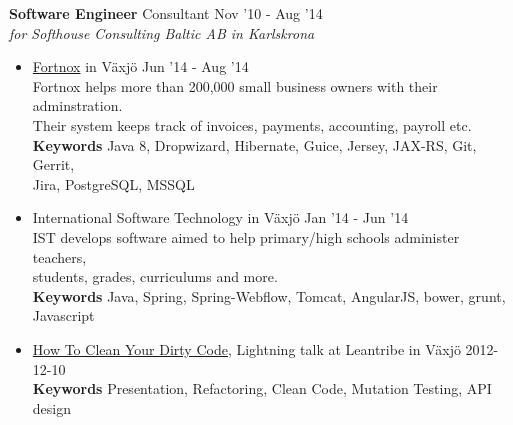 \documentclass[overlapped]{res}
\begin{document}
\begin{resume}
{\bf Software Engineer} Consultant \hfill Nov '10 - Aug '14 \\
{\sl for Softhouse Consulting Baltic AB in Karlskrona}
\begin{itemize}
\itemsep -1pt
\item \href{http://www.fortnox.se/}{Fortnox} in Växjö \hfill Jun '14 - Aug '14
\\Fortnox helps more than 200,000 small business owners with their adminstration. 
\\Their system keeps track of invoices, payments, accounting, payroll etc.
\\{\bf Keywords} Java 8, Dropwizard, Hibernate, Guice, Jersey, JAX-RS, Git, Gerrit, 
\\Jira, PostgreSQL, MSSQL
\\
\itemsep -1pt
\item International Software Technology in Växjö \hfill Jan '14 - Jun '14
\\IST develops software aimed to help primary/high schools administer teachers, 
\\students, grades, curriculums and more.
\\{\bf Keywords} Java, Spring, Spring-Webflow, Tomcat, AngularJS, bower, grunt, Javascript
\\
\item \href{http://www.youtube.com/watch?v=htalgZCFWMI}{How To Clean Your Dirty Code}, Lightning talk at Leantribe in Växjö \hfill 2012-12-10
	\\{\bf Keywords} Presentation, Refactoring, Clean Code, Mutation Testing, API design


\end{itemize}
\end{resume}
\end{document}

